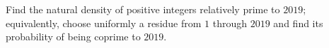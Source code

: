 Find the natural density of positive integers relatively prime to $2019$; equivalently, choose uniformly a residue from $1$ through $2019$ and find its probability of being coprime to $2019$.
